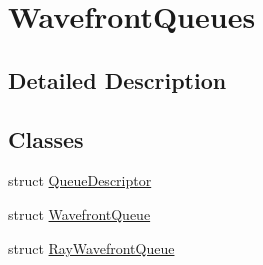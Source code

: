 \hypertarget{group___wavefront_queues}{}\section{Wavefront\+Queues}
\label{group___wavefront_queues}


\subsection{Detailed Description}
\subsection*{Classes}
\begin{DoxyCompactItemize}
\item 
struct \hyperlink{struct_queue_descriptor}{Queue\+Descriptor}
\item 
struct \hyperlink{struct_wavefront_queue}{Wavefront\+Queue}
\item 
struct \hyperlink{struct_ray_wavefront_queue}{Ray\+Wavefront\+Queue}
\end{DoxyCompactItemize}
